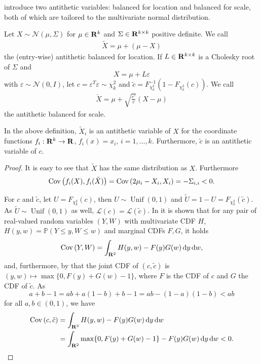 \citep{Durbin1997Monte} introduce two antithetic variables: balanced for location and balanced for scale, both of which are tailored to the multivariate normal distribution. 
\begin{definition}
    Let $X\sim \mathcal N(\mu, \Sigma)$ for $\mu \in \mathbf R^{k}$ and $\Sigma \in \mathbf R^{k\times k}$ positive definite. We call
    \begin{align}
        \label{eq:antithetic-location}
    \tilde X = \mu + (\mu - X)
    \end{align}
    the (entry-wise) antithetic balanced for location. If $L\in\mathbf R^{k\times k}$ is a Cholesky root of $\Sigma$ and 
    $$
        X = \mu + L \varepsilon
    $$
    with $\varepsilon \sim \mathcal N(0, I)$, let $c = \varepsilon^{T}\varepsilon \sim \chi^{2}_k$ and $\tilde c = F^{-1}_{\chi^{2}_{k}}(1 - F_{\chi^{2}_k}(c))$. We call
    \begin{align}
        \label{eq:antithetic-scale}
        \check X = \mu + \sqrt{\frac{c'}{c}} \left( X - \mu \right)
    \end{align}
    the antithetic balanced for scale.
\end{definition}
\begin{lemma}
    In the above definition, $\tilde X_{i}$ is an antithetic variable of $X$ for the coordinate functions $f_{i}:\mathbf R^{k} \to \mathbf R$, $f_{i}(x) = x_{i}$, $i = 1, \dots, k$.
    Furthermore, $\tilde c$ is an antithetic variable of $c$.
\end{lemma}
\begin{proof}
    It is easy to see that $\tilde X$ has the same distribution as $X$. Furthermore 
    $$
        \operatorname{Cov} \left( f_{i}(X), f_{i}(\tilde X)\right) = \operatorname{Cov} \left( 2 \mu_{i} - X_{i}, X_{i} \right) = - \Sigma_{i,i} < 0.
    $$

    For $c$ and $\tilde c$, let $U = F_{\chi^{2}_{k}}(c)$, then $U \sim \operatorname{Unif}(0,1)$ and $\tilde U = 1 - U = F_{\chi^{2}_k}(\tilde c)$. 
    As $\tilde U \sim \operatorname{Unif}(0, 1)$ as well, $\mathcal L (c) = \mathcal L (\tilde c)$.
    In \citep[Lemma 2.3]{Whitt1976Bivariate} it is shown that for any pair of real-valued random variables $(Y,W)$ with multivariate CDF $H$, $H(y,w) = \mathbb P(Y \leq y, W \leq w)$ and marginal CDFs $F, G$, it holds
    $$
        \operatorname{Cov} \left(Y,W \right) = \int_{\mathbf R^{2}} H(y,w) - F(y)G(w) \,\mathrm d y \,\mathrm d w,
    $$
    and, furthermore, by \citep[Theorem 2.1 and Lemma 2.4]{Whitt1976Bivariate} that the joint CDF of $(c, \tilde c)$ is $(y,w) \mapsto \max \{0, F(y) + G(w) - 1\}$, where $F$ is the CDF of $c$ and $G$ the CDF of $\tilde c$. 
    As 
    $$
        a + b - 1 = ab + a(1-b) + b - 1 = ab - (1 - a)(1 - b) < ab
    $$
    for all $a,b \in (0,1)$, we have 
    \begin{align*}
        \operatorname{Cov} \left( c, \tilde c \right) &= \int_{\mathbf R^{2}} H(y,w) - F(y)G(w) \,\mathrm d y \,\mathrm d w \\
        &= \int_{\mathbf R^{2}} \max\{0, F(y) + G(w) - 1\} - F(y)G(w) \,\mathrm d y \,\mathrm d w < 0.
    \end{align*}
\end{proof}
